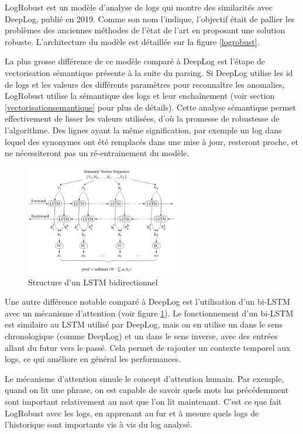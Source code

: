 \documentclass[openany, 11pt]{memoir}
\begin{document}
LogRobust \cite{logrobust} est un modèle d'analyse de \glspl{log} qui montre des similarités avec DeepLog, publié en 2019. Comme son nom l'indique, l'objectif était de pallier les problèmes des anciennes méthodes de l'état de l'art en proposant une solution robuste. L'architecture du modèle est détaillée sur la figure \ref{logrobust}.

\bigskip
La plus grosse différence de ce modèle comparé à DeepLog est l'étape de vectorisation sémantique présente à la suite du parsing. Si DeepLog utilise les id de \glspl{log} et les valeurs des différents paramètres pour reconnaître les anomalies, LogRobust utilise la sémantique des logs et leur enchaînement (voir section \ref{vectorisationsemantique} pour plus de détails). Cette analyse sémantique permet effectivement de lisser les valeurs utilisées, d'où la promesse de robustesse de l'algorithme. Des lignes ayant la même signification, par exemple un log dans lequel des synonymes ont été remplacés dans une mise à jour, resteront proche, et ne nécessiteront pas un ré-entrainement du modèle.

\begin{figure}[ht]
	\centering
	\includegraphics[width=0.6\textwidth]{images/bilstm.png}
	\caption{Structure d'un LSTM bidirectionnel}
	\label{bilstm}
\end{figure}

\bigskip
Une autre différence notable comparé à DeepLog est l'utilisation d'un bi-\gls{LSTM} avec un mécanisme d'attention (voir figure \ref{bilstm}). Le fonctionnement d'un bi-LSTM est similaire au LSTM utilisé par DeepLog, mais on en utilise un dans le sens chronologique (comme DeepLog) et un dans le sens inverse, avec des entrées allant du futur vers le passé. Cela permet de rajouter un contexte temporel aux \glspl{log}, ce qui améliore en général les performances.

Le mécanisme d'attention simule le concept d'attention humain. Par exemple, quand on lit une phrase, on est capable de savoir quels mots lus précédemment sont important relativement au mot que l'on lit maintenant. C'est ce que fait LogRobust avec les \glspl{log}, en apprenant au fur et à mesure quels logs de l'historique sont importants vis à vis du log analysé.
\end{document}
